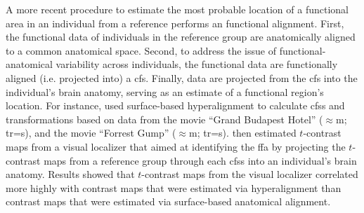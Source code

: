 
A more recent procedure \citep[e.g., ][]{jiahui2020predicting,
guntupalli2016model, haxby2011common} to estimate the most probable location of
a functional area in an individual from a reference performs an functional
alignment.
First, the functional data of individuals in the reference group are
anatomically aligned to a common anatomical space.
%
Second, to address the issue of functional-anatomical variability across
individuals, the functional data are functionally aligned (i.e. projected into)
a \ac{cfs}.
%
Finally, data are projected from the \ac{cfs} into the individual's brain
anatomy, serving as an estimate of a functional region's location.
For instance, \citet{jiahui2020predicting} used surface-based hyperalignment to
calculate \acp{cfs} and transformations based on data from
%
the movie ``Grand Budapest Hotel'' ($\approx$\unit[50]{m}; \ac{tr}=\unit[1]{s}),
and
%
the movie ``Forrest Gump'' ($\approx$\unit[120]{m}; \ac{tr}=\unit[2]{s}).
%
\citet{jiahui2020predicting} then estimated $t$-contrast maps from a visual
localizer that aimed at identifying the \ac{ffa} by projecting the $t$-contrast
maps from a reference group through each \acp{cfs} into an individual's brain
anatomy.
%
Results showed that $t$-contrast maps from the visual localizer correlated more
highly with contrast maps that were estimated via hyperalignment than contrast
maps that were estimated via surface-based anatomical alignment.



